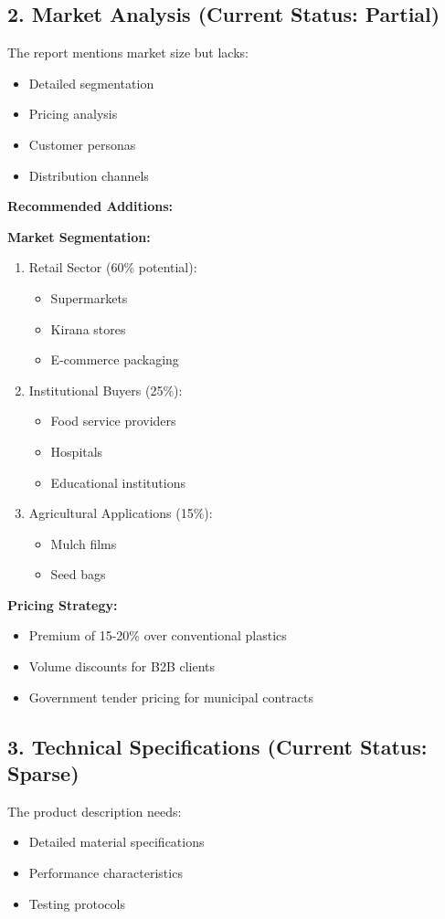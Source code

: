 \subsection*{2. Market Analysis (Current Status: Partial)}
The report mentions market size but lacks:
\begin{itemize}
\item Detailed segmentation
\item Pricing analysis
\item Customer personas
\item Distribution channels
\end{itemize}

\textbf{Recommended Additions:}

\textbf{Market Segmentation:}
\begin{enumerate}
\item Retail Sector (60\% potential):
\begin{itemize}
\item Supermarkets
\item Kirana stores
\item E-commerce packaging
\end{itemize}
\item Institutional Buyers (25\%):
\begin{itemize}
\item Food service providers
\item Hospitals
\item Educational institutions
\end{itemize}
\item Agricultural Applications (15\%):
\begin{itemize}
\item Mulch films
\item Seed bags
\end{itemize}
\end{enumerate}

\textbf{Pricing Strategy:}
\begin{itemize}
\item Premium of 15-20\% over conventional plastics
\item Volume discounts for B2B clients
\item Government tender pricing for municipal contracts
\end{itemize}

\subsection*{3. Technical Specifications (Current Status: Sparse)}
The product description needs:
\begin{itemize}
\item Detailed material specifications
\item Performance characteristics
\item Testing protocols
\end{itemize}

